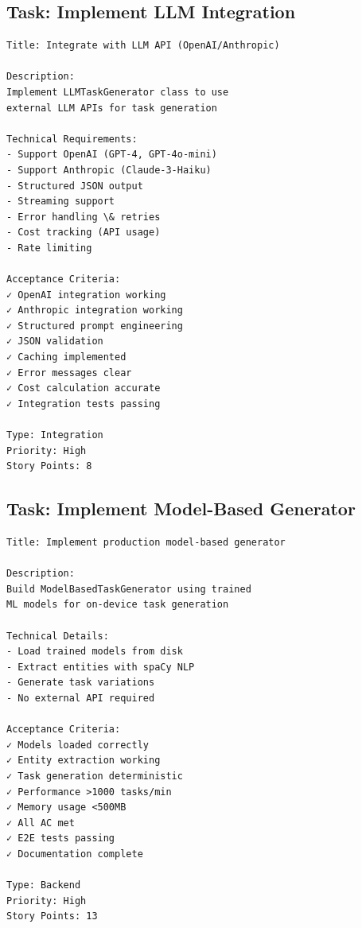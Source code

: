\documentclass[12pt, a4paper]{report}
\begin{document}
\subsection{Task: Implement LLM Integration}

\begin{tcolorbox}[colback=blue!5]
\begin{lstlisting}
Title: Integrate with LLM API (OpenAI/Anthropic)

Description:
Implement LLMTaskGenerator class to use
external LLM APIs for task generation

Technical Requirements:
- Support OpenAI (GPT-4, GPT-4o-mini)
- Support Anthropic (Claude-3-Haiku)
- Structured JSON output
- Streaming support
- Error handling \& retries
- Cost tracking (API usage)
- Rate limiting

Acceptance Criteria:
✓ OpenAI integration working
✓ Anthropic integration working
✓ Structured prompt engineering
✓ JSON validation
✓ Caching implemented
✓ Error messages clear
✓ Cost calculation accurate
✓ Integration tests passing

Type: Integration
Priority: High
Story Points: 8
\end{lstlisting}
\end{tcolorbox}

\subsection{Task: Implement Model-Based Generator}

\begin{tcolorbox}[colback=green!5]
\begin{lstlisting}
Title: Implement production model-based generator

Description:
Build ModelBasedTaskGenerator using trained
ML models for on-device task generation

Technical Details:
- Load trained models from disk
- Extract entities with spaCy NLP
- Generate task variations
- No external API required

Acceptance Criteria:
✓ Models loaded correctly
✓ Entity extraction working
✓ Task generation deterministic
✓ Performance >1000 tasks/min
✓ Memory usage <500MB
✓ All AC met
✓ E2E tests passing
✓ Documentation complete

Type: Backend
Priority: High
Story Points: 13
\end{lstlisting}
\end{tcolorbox}

\newpage
\end{document}
